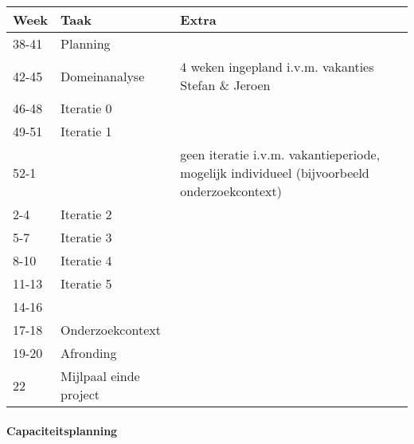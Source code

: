\begin{tabular}{llp{10cm}}\hline
{\bf Week}    & {\bf Taak}  & {\bf Extra}\\\hline
38-41         & Planning    \\
42-45         & Domeinanalyse & 4 weken ingepland i.v.m. vakanties Stefan \& Jeroen \\
46-48         & Iteratie 0    \\
49-51         & Iteratie 1    \\
52-1          &               & geen iteratie i.v.m. vakantieperiode, mogelijk
				individueel (bijvoorbeeld onderzoekcontext) \\
2-4           & Iteratie 2    \\
5-7           & Iteratie 3    \\
8-10          & Iteratie 4    \\
11-13         & Iteratie 5    \\
14-16         &               \\
17-18         & Onderzoekcontext \\
19-20         & Afronding     \\
22            & Mijlpaal einde project

\end{tabular}




\paragraph{Capaciteitsplanning}

